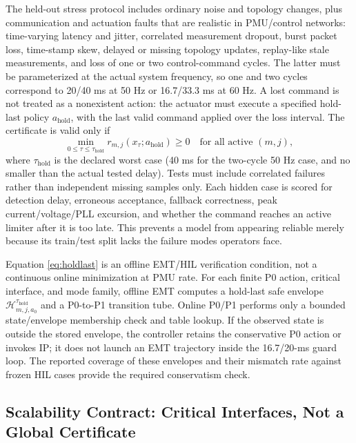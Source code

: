 \documentclass[conference]{IEEEtran}
\begin{document}
The held-out stress protocol includes ordinary noise and topology changes, plus communication and actuation faults that are realistic in PMU/control networks: time-varying latency and jitter, correlated measurement dropout, burst packet loss, time-stamp skew, delayed or missing topology updates, replay-like stale measurements, and loss of one or two control-command cycles. The latter must be parameterized at the actual system frequency, so one and two cycles correspond to 20/40 ms at 50 Hz or 16.7/33.3 ms at 60 Hz. A lost command is not treated as a nonexistent action: the actuator must execute a specified hold-last policy $a_{\mathrm{hold}}$, with the last valid command applied over the loss interval. The certificate is valid only if
\begin{equation}
\min_{0\leq\tau\leq\tau_{\mathrm{hold}}}
r_{m,j}\!\left(x_{\tau};a_{\mathrm{hold}}\right)\geq0
\quad\text{for all active }(m,j),
\label{eq:holdlast}
\end{equation}
where $\tau_{\mathrm{hold}}$ is the declared worst case (40 ms for the two-cycle 50 Hz case, and no smaller than the actual tested delay). Tests must include correlated failures rather than independent missing samples only. Each hidden case is scored for detection delay, erroneous acceptance, fallback correctness, peak current/voltage/PLL excursion, and whether the command reaches an active limiter after it is too late. This prevents a model from appearing reliable merely because its train/test split lacks the failure modes operators face.

Equation \eqref{eq:holdlast} is an offline EMT/HIL verification condition, not a continuous online minimization at PMU rate. For each finite P0 action, critical interface, and mode family, offline EMT computes a hold-last safe envelope $\mathcal H_{m,j,a_0}^{\tau_{\mathrm{hold}}}$ and a P0-to-P1 transition tube. Online P0/P1 performs only a bounded state/envelope membership check and table lookup. If the observed state is outside the stored envelope, the controller retains the conservative P0 action or invokes IP; it does not launch an EMT trajectory inside the 16.7/20-ms guard loop. The reported coverage of these envelopes and their mismatch rate against frozen HIL cases provide the required conservatism check.

\subsection{Scalability Contract: Critical Interfaces, Not a Global Certificate}
\end{document}
